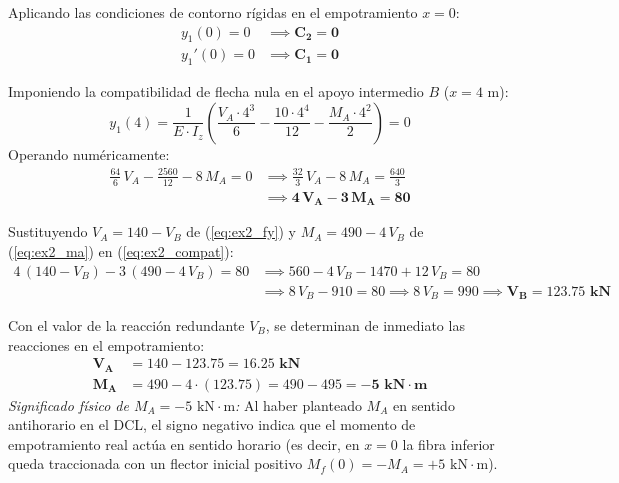 {    Aplicando las condiciones de contorno rígidas en el empotramiento $x = 0$:
    \begin{align}
        y_1(0) = 0  & \implies \mathbf{C_2 = 0} \\
        y_1'(0) = 0 & \implies \mathbf{C_1 = 0}
    \end{align}

    Imponiendo la compatibilidad de flecha nula en el apoyo intermedio $B$ ($x = 4\text{ m}$):
    \begin{equation}
        y_1(4) = \frac{1}{E \cdot I_z}\left(\frac{V_A \cdot 4^3}{6} - \frac{10 \cdot 4^4}{12} - \frac{M_A \cdot 4^2}{2}\right) = 0
    \end{equation}
    Operando numéricamente:
    \begin{align}
        \frac{64}{6}\,V_A - \frac{2560}{12} - 8\,M_A = 0 & \implies \frac{32}{3}\,V_A - 8\,M_A = \frac{640}{3} \nonumber \\
                                                         & \implies \mathbf{4\,V_A - 3\,M_A = 80} \label{eq:ex2_compat}
    \end{align}

    Sustituyendo $V_A = 140 - V_B$ de (\ref{eq:ex2_fy}) y $M_A = 490 - 4\,V_B$ de (\ref{eq:ex2_ma}) en (\ref{eq:ex2_compat}):
    \begin{align}
        4\,(140 - V_B) - 3\,(490 - 4\,V_B) = 80 & \implies 560 - 4\,V_B - 1470 + 12\,V_B = 80 \nonumber \\
                                                & \implies 8\,V_B - 910 = 80 \implies 8\,V_B = 990 \implies \mathbf{V_B = 123.75\text{ kN}}
    \end{align}

    Con el valor de la reacción redundante $V_B$, se determinan de inmediato las reacciones en el empotramiento:
    \begin{align}
        \mathbf{V_A} & = 140 - 123.75 = \mathbf{16.25\text{ kN}}                                        \\
        \mathbf{M_A} & = 490 - 4 \cdot (123.75) = 490 - 495 = \mathbf{-5\text{ kN}\cdot\text{m}}
    \end{align}
    \textit{Significado físico de $M_A = -5\text{ kN}\cdot\text{m}$:} Al haber planteado $M_A$ en sentido antihorario en el DCL, el signo negativo indica que el momento de empotramiento real actúa en sentido horario (es decir, en $x = 0$ la fibra inferior queda traccionada con un flector inicial positivo $M_f(0) = -M_A = +5\text{ kN}\cdot\text{m}$).

}
